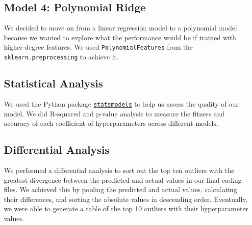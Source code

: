 \subsection{Model 4: Polynomial Ridge}
We decided to move on from a linear regression model to a polynomial model because we wanted to explore what the performance would be if trained with higher-degree features. We used \texttt{PolynomialFeatures} from the \texttt{sklearn.preprocessing} to achieve it.

\subsection{Statistical Analysis}
We used the Python package \href{https://www.statsmodels.org/stable/index.html}{\texttt{statsmodels}} to help us assess the quality of our model. We did R-squared and p-value analysis to measure the fitness and accuracy of each coefficient of hyperparameters across different models.

\subsection{Differential Analysis}
We performed a differential analysis to sort out the top ten outliers with the greatest divergence between the predicted and actual values in our final coding files. We achieved this by pooling the predicted and actual values, calculating their differences, and sorting the absolute values in descending order. Eventually, we were able to generate a table of the top 10 outliers with their hyperparameter values.